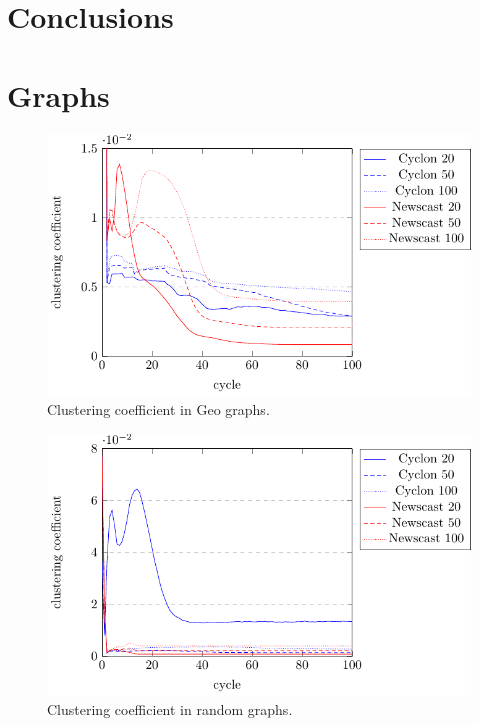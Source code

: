 \documentclass[a4paper]{ifacconf}
\begin{document}
\section{Conclusions}



\section{Graphs}

\begin{figure}[p]
    \centering
    \includegraphics[width=\linewidth]{"figures/clustering coefficient geo"}
    \caption{Clustering coefficient in Geo graphs.}
    \label{fig:clustering-coefficient-geo}
\end{figure}
\begin{figure}[p]
    \centering
    \includegraphics[width=\linewidth]{"figures/clustering coefficient random"}
    \caption{Clustering coefficient in random graphs.}
    \label{fig:clustering-coefficient-random}
\end{figure}
\end{document}
